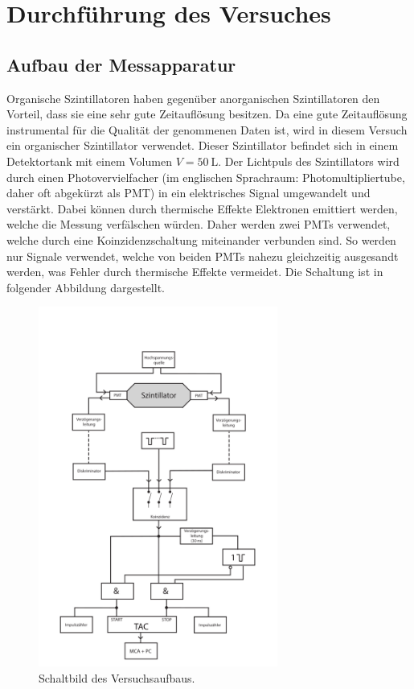 \section{Durchführung des Versuches}
\label{sec:Durchführung}
\subsection{Aufbau der Messapparatur}
\label{subsec:Aufbau}
Organische Szintillatoren haben gegenüber anorganischen Szintillatoren den Vorteil, dass sie eine sehr
gute Zeitauflösung besitzen. Da eine gute Zeitauflösung instrumental für die Qualität der genommenen
Daten ist, wird in diesem Versuch ein organischer Szintillator verwendet.
Dieser Szintillator befindet sich in einem Detektortank mit einem Volumen $V = \SI{50}{\liter}$.
Der Lichtpuls des Szintillators wird durch einen Photovervielfacher (im englischen Sprachraum: Photomultipliertube,
daher oft abgekürzt als PMT) in ein elektrisches Signal umgewandelt und verstärkt.
Dabei können durch thermische Effekte Elektronen emittiert werden, welche die
Messung verfälschen würden. Daher werden zwei PMTs verwendet, welche durch eine
Koinzidenzschaltung miteinander verbunden sind. So werden nur Signale verwendet, welche
von beiden PMTs nahezu gleichzeitig ausgesandt werden, was Fehler durch thermische
Effekte vermeidet.
Die Schaltung ist in folgender Abbildung dargestellt.
\begin{figure}[H]
  \centering
    \includegraphics[width=0.7\textwidth]{pictures/Schaltbild.png}
    \caption{Schaltbild des Versuchsaufbaus. \cite{Versuchsbeschreibung}}
    \label{fig:Schaltbild}
\end{figure}
